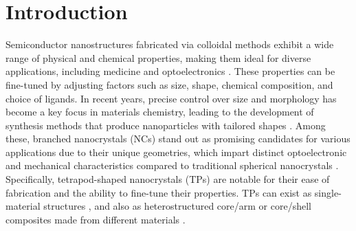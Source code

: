 \documentclass[nanomaterials,article,submit,moreauthors,pdftex]{Definitions/mdpi}
\begin{document}
\section{Introduction}
Semiconductor nanostructures fabricated via colloidal methods exhibit a wide range of physical and chemical properties, making them ideal for diverse applications, including medicine \cite{Chattopadhyay2006, Kolosnjaj2015} and optoelectronics \cite{Talapin2010, Kriegel2012}. These properties can be fine-tuned by adjusting factors such as size, shape, chemical composition, and choice of ligands. In recent years, precise control over size and morphology has become a key focus in materials chemistry, leading to the development of synthesis methods that produce nanoparticles with tailored shapes \cite{Kim2023, Lee2020, Huang2021}. Among these, branched nanocrystals (NCs) stand out as promising candidates for various applications due to their unique geometries, which impart distinct optoelectronic and mechanical characteristics compared to traditional spherical nanocrystals \cite{Mishra2019}. Specifically, tetrapod-shaped nanocrystals (TPs) are notable for their ease of fabrication and the ability to fine-tune their properties. TPs can exist as single-material structures \cite{Liu2023}, and also as heterostructured core/arm or core/shell composites made from different materials \cite{Enright2020, Kim2018, Wu2014, Zhao2014}.

\end{document}
